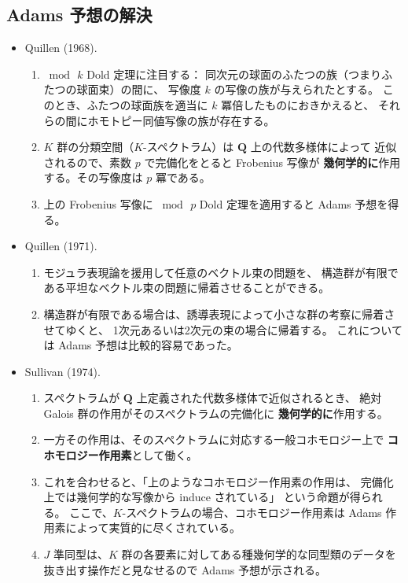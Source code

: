 \documentclass[uplatex,dvipdfmx,a4paper,12pt]{jlreq}
\newcommand{\Q}{\mathbf{Q}}
\begin{document}
\subsection{Adams 予想の解決}

\begin{itemize}
  \item \cite{Q68} Quillen (1968).
        \begin{enumerate}
          \item $\bmod\, k$ Dold 定理に注目する：
                同次元の球面のふたつの族（つまりふたつの球面束）の間に、
                写像度 $k$ の写像の族が与えられたとする。
                このとき、ふたつの球面族を適当に $k$ 冪倍したものにおきかえると、
                それらの間にホモトピー同値写像の族が存在する。
          \item $K$ 群の分類空間（$K$-スペクトラム）は $\Q$ 上の代数多様体によって
                近似されるので、素数 $p$ で完備化をとると Frobenius 写像が
                \textbf{幾何学的に}作用する。その写像度は $p$ 冪である。
          \item 上の Frobenius 写像に $\bmod\, p$ Dold 定理を適用すると
                Adams 予想を得る。
        \end{enumerate}

  \item \cite{Q71} Quillen (1971).
        \begin{enumerate}
          \item モジュラ表現論を援用して任意のベクトル束の問題を、
                構造群が有限である平坦なベクトル束の問題に帰着させることができる。
          \item 構造群が有限である場合は、誘導表現によって小さな群の考察に帰着させてゆくと、
                1次元あるいは2次元の束の場合に帰着する。
                これについては Adams 予想は比較的容易であった。
        \end{enumerate}

  \item \cite{S74} Sullivan (1974).
        \begin{enumerate}
          \item スペクトラムが $\Q$ 上定義された代数多様体で近似されるとき、
                絶対 Galois 群の作用がそのスペクトラムの完備化に
                \textbf{幾何学的に}作用する。
          \item 一方その作用は、そのスペクトラムに対応する一般コホモロジー上で
                \textbf{コホモロジー作用素}として働く。
          \item これを合わせると、「上のようなコホモロジー作用素の作用は、
                完備化上では幾何学的な写像から induce されている」
                という命題が得られる。
                ここで、$K$-スペクトラムの場合、コホモロジー作用素は
                Adams 作用素によって実質的に尽くされている。
          \item $J$ 準同型は、$K$ 群の各要素に対してある種幾何学的な同型類のデータを
                抜き出す操作だと見なせるので Adams 予想が示される。
        \end{enumerate}


\end{itemize}
\end{document}
